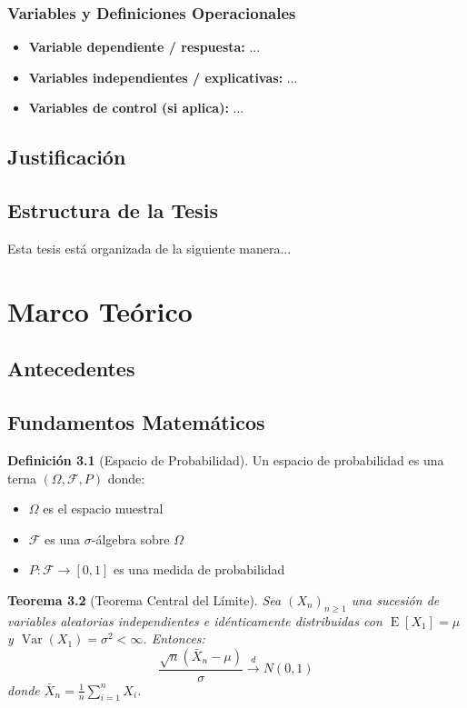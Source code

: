 \documentclass[12pt,a4paper,oneside]{book}
\theoremstyle{plain}
\newtheorem{theorem}{Teorema}[chapter]
\theoremstyle{definition}
\newtheorem{definition}[theorem]{Definición}
\theoremstyle{remark}
\DeclareMathOperator{\Var}{Var}
\DeclareMathOperator{\E}{E}
\begin{document}
\subsection{Variables y Definiciones Operacionales}
\begin{itemize}
  \item \textbf{Variable dependiente / respuesta:} ...
  \item \textbf{Variables independientes / explicativas:} ...
  \item \textbf{Variables de control (si aplica):} ...
\end{itemize}

\section{Justificación}
\lipsum[6]

\section{Estructura de la Tesis}
Esta tesis está organizada de la siguiente manera...

\chapter{Marco Teórico}

\section{Antecedentes}
\lipsum[7-8]

\section{Fundamentos Matemáticos}

\begin{definition}[Espacio de Probabilidad]\label{def:prob_space}
Un espacio de probabilidad es una terna $(\Omega, \mathcal{F}, P)$ donde:
\begin{itemize}
    \item $\Omega$ es el espacio muestral
    \item $\mathcal{F}$ es una $\sigma$-álgebra sobre $\Omega$
    \item $P: \mathcal{F} \to [0,1]$ es una medida de probabilidad
\end{itemize}
\end{definition}

\begin{theorem}[Teorema Central del Límite]\label{thm:clt}
Sea $(X_n)_{n \geq 1}$ una sucesión de variables aleatorias independientes e idénticamente distribuidas con $\E[X_1] = \mu$ y $\Var(X_1) = \sigma^2 < \infty$. Entonces:
$$
\frac{\sqrt{n}(\bar{X}_n - \mu)}{\sigma} \xrightarrow{d} N(0,1)
$$
donde $\bar{X}_n = \frac{1}{n}\sum_{i=1}^n X_i$.
\end{theorem}
\end{document}
